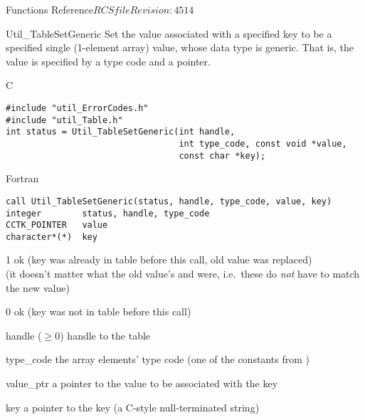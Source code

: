 \begin{cactuspart}{ Functions Reference}{$RCSfile$}{$Revision: 4514 $}
\begin{FunctionDescription}{Util\_TableSetGeneric}
\label{Util-TableSetGeneric}
Set the value associated with a specified key to be a specified
single (1-element array) value, whose data type is generic.  That
is, the value is specified by a  type code
and a  pointer.

\begin{SynopsisSection}
\begin{Synopsis}{C}
\begin{verbatim}
#include "util_ErrorCodes.h"
#include "util_Table.h"
int status = Util_TableSetGeneric(int handle,
                                  int type_code, const void *value,
                                  const char *key);
\end{verbatim}
\end{Synopsis}
\begin{Synopsis}{Fortran}
\begin{verbatim}
call Util_TableSetGeneric(status, handle, type_code, value, key)
integer        status, handle, type_code
CCTK_POINTER   value
character*(*)  key
\end{verbatim}
\end{Synopsis}
\end{SynopsisSection}

\begin{ResultSection}
\begin{Result}{\rm 1}
ok (key was already in table before this call, old value was replaced)\\
   (it doesn't matter what the old value's  and
     were, i.e.\ these do {\em not\/} have to match
    the new value)
\end{Result}
\begin{Result}{\rm 0}
ok (key was not in table before this call)
\end{Result}
\end{ResultSection}

\begin{ParameterSection}
\begin{Parameter}{handle ($\ge 0$)}
handle to the table
\end{Parameter}
\begin{Parameter}{type\_code}
the array elements' type code
(one of the  constants from )
\end{Parameter}
\begin{Parameter}{value\_ptr}
a pointer to the value to be associated with the key
\end{Parameter}
\begin{Parameter}{key}
a pointer to the key (a C-style null-terminated string)
\end{Parameter}
\end{ParameterSection}


\end{FunctionDescription}
\end{cactuspart}
